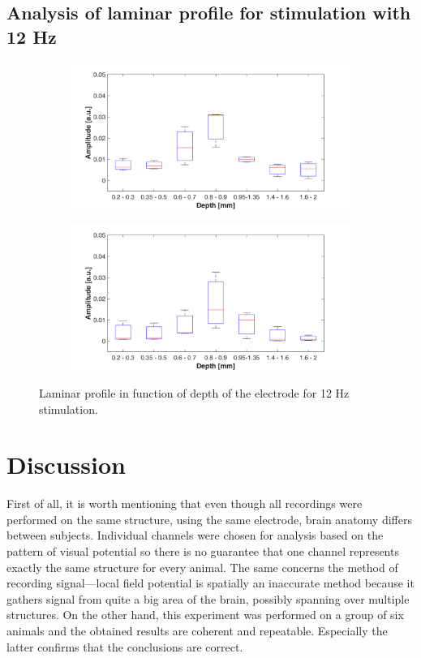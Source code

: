 \documentclass{pracalicmgr}
\begin{document}
\section{Analysis of laminar profile for stimulation with 12 Hz}  
   	\begin{figure}[H]
	\begin{subfigure}{.5\textwidth}
		\centering
		\includegraphics[width=1.\linewidth]{profile_12Hz_wid.png}
		\caption{}
		\label{rys:profil_12Hz_wid1}
	\end{subfigure}%
	\begin{subfigure}{.5\textwidth}
		\centering
		\includegraphics[width=1.\linewidth]{profile_12Hz_wid2.png}
		\caption{}
		\label{rys:profil_12Hz_wid2}
	\end{subfigure}
	
	\caption{Laminar profile in function of depth of the electrode for 12 Hz stimulation.}
	\label{rys:profil_12Hz_wid}
\end{figure}
    \chapter{Discussion}
    
    First of all, it is worth mentioning that even though all recordings were performed on the same structure, using the same electrode, brain anatomy differs between subjects. Individual channels were chosen for analysis based on the pattern of visual potential so there is no guarantee that one channel represents exactly the same structure for every animal. The same concerns the method of recording signal---local field potential is spatially an inaccurate method because it gathers signal from quite a big area of the brain, possibly spanning over multiple structures. On the other hand, this experiment was performed on a group of six animals and the obtained results are coherent and repeatable. Especially the latter confirms that the conclusions are correct. 
    
\end{document}
